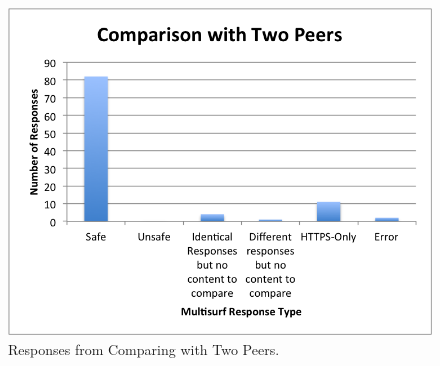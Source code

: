 \begin{figure}[htb]
\label{fig:twopeers}
\begin{center}
\includegraphics[width=\linewidth]{twopeers}
\caption{Responses from Comparing with Two Peers.}
\end{center}
\end{figure}
